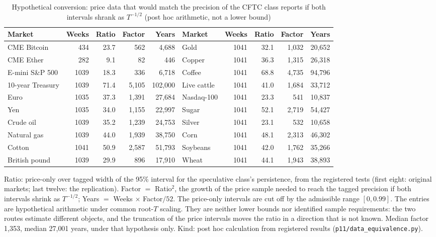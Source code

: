 \begin{table}[!htbp]\centering\footnotesize
\begin{threeparttable}
\caption{Hypothetical conversion: price data that would match the precision of the CFTC class reports if both intervals shrank as $T^{-1/2}$ (post hoc arithmetic, not a lower bound)}\label{tab:dataequiv}
\setlength{\tabcolsep}{2.5pt}
\begin{tabular}{lrrrr@{\hspace{10pt}}lrrrr}
\toprule
Market & Weeks & Ratio & Factor & Years & Market & Weeks & Ratio & Factor & Years\\
\midrule
CME Bitcoin & 434 & 23.7 & 562 & 4{,}688 & Gold & 1041 & 32.1 & 1{,}032 & 20{,}652\\
CME Ether & 282 & 9.1 & 82 & 446 & Copper & 1041 & 36.3 & 1{,}315 & 26{,}318\\
E-mini S\&P 500 & 1039 & 18.3 & 336 & 6{,}718 & Coffee & 1041 & 68.8 & 4{,}735 & 94{,}796\\
10-year Treasury & 1039 & 71.4 & 5{,}105 & 102{,}000 & Live cattle & 1041 & 41.0 & 1{,}684 & 33{,}712\\
Euro & 1035 & 37.3 & 1{,}391 & 27{,}684 & Nasdaq-100 & 1041 & 23.3 & 541 & 10{,}837\\
Yen & 1035 & 34.0 & 1{,}155 & 22{,}997 & Sugar & 1041 & 52.1 & 2{,}719 & 54{,}427\\
Crude oil & 1039 & 35.2 & 1{,}239 & 24{,}753 & Silver & 1041 & 23.1 & 532 & 10{,}658\\
Natural gas & 1039 & 44.0 & 1{,}939 & 38{,}750 & Corn & 1041 & 48.1 & 2{,}313 & 46{,}302\\
Cotton & 1041 & 50.9 & 2{,}587 & 51{,}793 & Soybeans & 1041 & 42.0 & 1{,}762 & 35{,}266\\
British pound & 1039 & 29.9 & 896 & 17{,}910 & Wheat & 1041 & 44.1 & 1{,}943 & 38{,}893\\
\bottomrule
\end{tabular}
\begin{tablenotes}\footnotesize\item Ratio: price-only over tagged width of the 95\% interval for the speculative class's persistence, from the registered tests (first eight: original markets; last twelve: the replication). Factor $=$ Ratio$^2$, the growth of the price sample needed to reach the tagged precision if both intervals shrink as $T^{-1/2}$; Years $=$ Weeks $\times$ Factor$/52$. The price-only intervals are cut off by the admissible range $[0,0.99]$. The entries are hypothetical arithmetic under common root-$T$ scaling. They are neither lower bounds nor identified sample requirements: the two routes estimate different objects, and the truncation of the price intervals moves the ratio in a direction that is not known. Median factor 1{,}353, median 27{,}001 years, under that hypothesis only. Kind: post hoc calculation from registered results (\texttt{p11/data\_equivalence.py}).\end{tablenotes}
\end{threeparttable}
\end{table}

